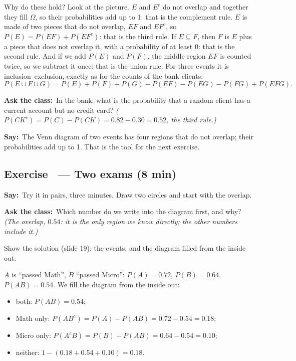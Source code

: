 \documentclass[11pt,a4paper,parskip=half]{scrartcl}
\newcommand{\Om}{\Omega}
\newcommand{\say}{\textbf{\color{teal}Say:}\ }
\newcommand{\ask}{\textbf{\color{navy}Ask the class:}\ }
\begin{document}
Why do these hold? Look at the picture. $E$ and $E^c$ do not overlap and
together they fill $\Om$, so their probabilities add up to 1: that is the
complement rule. $E$ is made of two pieces that do not overlap, $EF$ and
$EF^c$, so $P(E)=P(EF)+P(EF^c)$: that is the third rule. If $E\subseteq F$,
then $F$ is $E$ plus a piece that does not overlap it, with a probability
of at least 0: that is the second rule. And if we add $P(E)$ and $P(F)$,
the middle region $EF$ is counted twice, so we subtract it once: that is the
union rule. For three events it is inclusion--exclusion, exactly as for the
counts of the bank clients:
\[ P(E\cup F\cup G)=P(E)+P(F)+P(G)-P(EF)-P(EG)-P(FG)+P(EFG). \]

\ask In the bank: what is the probability that a random client has a
current account but no credit card? \emph{($P(CK^c)=P(C)-P(CK)=0.82-0.30
=0.52$, the third rule.)}

\say The Venn diagram of two events has four regions that do not overlap;
their probabilities add up to 1. That is the tool for the next exercise.

\subsection{Exercise~ --- Two exams (8 min)}


\say Try it in pairs, three minutes. Draw two circles and start with the
overlap.

\ask Which number do we write into the diagram first, and why? \emph{(The
overlap, $0.54$: it is the only region we know directly; the other numbers
include it.)}

\begin{slidecue}
	Show the solution (slide 19): the events, and the diagram filled from the
	inside out.
\end{slidecue}

$A$ is ``passed Math'', $B$ ``passed Micro'': $P(A)=0.72$, $P(B)=0.64$,
$P(AB)=0.54$. We fill the diagram from the inside out:
\begin{itemize}
	\item both: $P(AB)=0.54$;
	\item Math only: $P(AB^c)=P(A)-P(AB)=0.72-0.54=0.18$;
	\item Micro only: $P(A^cB)=P(B)-P(AB)=0.64-0.54=0.10$;
	\item neither: $1-(0.18+0.54+0.10)=0.18$.
\end{itemize}
\end{document}
